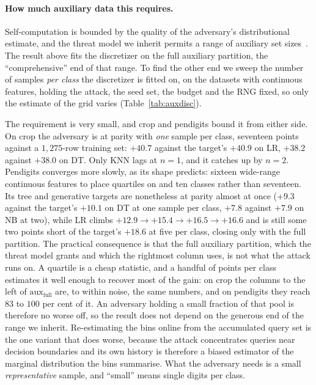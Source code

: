 \documentclass[sigconf,anonymous,review]{acmart}
\begin{document}
\paragraph{How much auxiliary data this requires.} Self-computation is bounded by the quality of the
adversary's distributional estimate, and the threat model we inherit permits a range of auxiliary set
sizes~\cite{oksuz2024autolycus}. The result above fits the discretizer on the full auxiliary
partition, the ``comprehensive'' end of that range. To find the other end we sweep the number of
samples \emph{per class} the discretizer is fitted on, on the datasets with continuous features,
holding the attack, the seed set, the budget and the RNG fixed, so only the estimate of the grid
varies (Table~\ref{tab:auxdisc}).

The requirement is very small, and crop and pendigits bound it from either side. On crop the adversary
is at parity with \emph{one} sample per class, seventeen points against a $1{,}275$-row training set:
$+40.7$ against the target's $+40.9$ on LR, $+38.2$ against $+38.0$ on DT. Only KNN lags at $n{=}1$,
and it catches up by $n{=}2$. Pendigits converges more slowly, as its shape predicts: sixteen
wide-range continuous features to place quartiles on and ten classes rather than seventeen. Its tree
and generative targets are nonetheless at parity almost at once ($+9.3$ against the target's $+10.1$
on DT at one sample per class, $+7.8$ against $+7.9$ on NB at two), while LR climbs
$+12.9 \to +15.4 \to +16.5 \to +16.6$ and is still some two points short of the target's $+18.6$ at
five per class, closing only with the full partition.
The practical consequence is that the full auxiliary partition, which the threat model grants and
which the rightmost column uses, is not what the attack runs on. A quartile is a cheap statistic, and
a handful of points per class estimates it well enough to recover most of the gain: on crop the
columns to the left of $\text{aux}_{\text{full}}$ are, to within noise, the same numbers, and on
pendigits they reach $83$ to $100$ per cent of it.
An adversary holding a small fraction of that pool is therefore no worse off, so the result does not
depend on the generous end of the range we inherit. Re-estimating the bins online from the accumulated
query set is the one variant that does worse, because the attack concentrates queries near decision
boundaries and its own history is therefore a biased estimator of the marginal distribution the bins
summarise. What the adversary needs is a small \emph{representative} sample, and ``small'' means
single digits per class.
\end{document}
